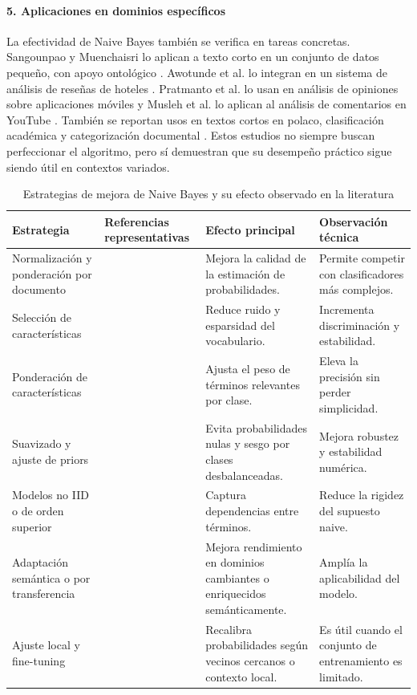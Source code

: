 \paragraph{5. Aplicaciones en dominios específicos}

La efectividad de Naive Bayes también se verifica en tareas concretas. Sangounpao y Muenchaisri lo aplican a texto corto en un conjunto de datos pequeño, con apoyo ontológico \cite{Sangounpao2019}. Awotunde et al. lo integran en un sistema de análisis de reseñas de hoteles \cite{Awotunde2023131}. Pratmanto et al. lo usan en análisis de opiniones sobre aplicaciones móviles y Musleh et al. lo aplican al análisis de comentarios en YouTube \cite{Pratmanto2020,Musleh2023}. También se reportan usos en textos cortos en polaco, clasificación académica y categorización documental \cite{Wawer20191321,Humaidi2023,Wang2007,Mendoza2011251}. Estos estudios no siempre buscan perfeccionar el algoritmo, pero sí demuestran que su desempeño práctico sigue siendo útil en contextos variados.

\begin{table}[htbp]
\centering
\caption{Estrategias de mejora de Naive Bayes y su efecto observado en la literatura}
\label{tab:mejoras}
\begin{tabular}{|p{4.1cm}|p{3.4cm}|p{4.0cm}|p{4.0cm}|}
\hline
\textbf{Estrategia} & \textbf{Referencias representativas} & \textbf{Efecto principal} & \textbf{Observación técnica} \\
\hline
Normalización y ponderación por documento & \cite{Kim2006,10.1007/978-3-540-30549-1_43} & Mejora la calidad de la estimación de probabilidades. & Permite competir con clasificadores más complejos. \\
\hline
Selección de características & \cite{CHEN20095432,YOUN2009477,Tang20162508} & Reduce ruido y esparsidad del vocabulario. & Incrementa discriminación y estabilidad. \\
\hline
Ponderación de características & \cite{Jiang2016,ZHANG2016137,Ruan202020151} & Ajusta el peso de términos relevantes por clase. & Eleva la precisión sin perder simplicidad. \\
\hline
Suavizado y ajuste de priors & \cite{Frank2006,10.1007/978-3-540-71496-5_73} & Evita probabilidades nulas y sesgo por clases desbalanceadas. & Mejora robustez y estabilidad numérica. \\
\hline
Modelos no IID o de orden superior & \cite{Ganiz20111022,4554061,Gan2021} & Captura dependencias entre términos. & Reduce la rigidez del supuesto naive. \\
\hline
Adaptación semántica o por transferencia & \cite{KIM2018128,10.5555/1619645.1619732} & Mejora rendimiento en dominios cambiantes o enriquecidos semánticamente. & Amplía la aplicabilidad del modelo. \\
\hline
Ajuste local y fine-tuning & \cite{ELHINDI2020106652} & Recalibra probabilidades según vecinos cercanos o contexto local. & Es útil cuando el conjunto de entrenamiento es limitado. \\
\hline
\end{tabular}
\end{table}

